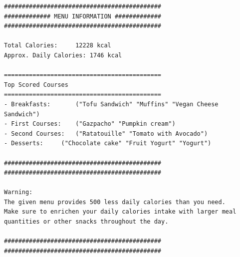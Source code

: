 \documentclass[11]{article}
\begin{document}
\begin{lstlisting}[frame=single]
############################################
############# MENU INFORMATION #############
############################################

Total Calories:		12228 kcal
Approx. Daily Calories:	1746 kcal

============================================
Top Scored Courses
============================================
- Breakfasts:		("Tofu Sandwich" "Muffins" "Vegan Cheese Sandwich")
- First Courses:	("Gazpacho" "Pumpkin cream")
- Second Courses:	("Ratatouille" "Tomato with Avocado")
- Desserts:		("Chocolate cake" "Fruit Yogurt" "Yogurt")

############################################
############################################

Warning:
The given menu provides 500 less daily calories than you need.
Make sure to enrichen your daily calories intake with larger meal quantities or other snacks throughout the day.

############################################
############################################
\end{lstlisting}
\end{document}
